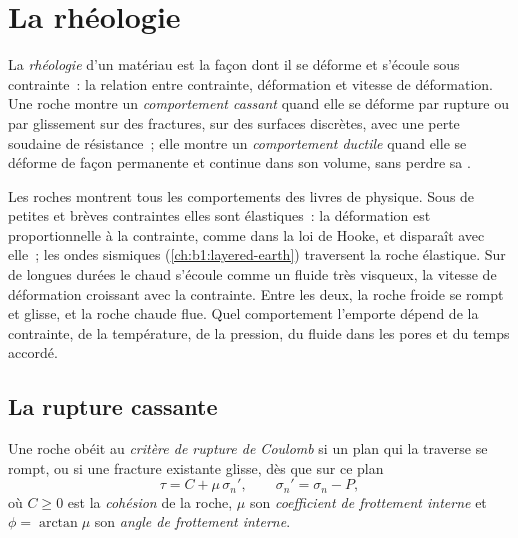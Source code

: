 \section{La rhéologie}\label{sec:b1:stress-strain-rheology:rheology}

\begin{definition}\label{def:b1:stress-strain-rheology:rheology}
La \emph{rhéologie} d'un matériau est la façon dont il se déforme et
s'écoule sous contrainte~: la relation entre contrainte, déformation et vitesse de
déformation. Une roche montre un \emph{comportement cassant} quand
elle se déforme par rupture ou par glissement sur des fractures, sur des surfaces discrètes, avec
une perte soudaine de résistance~; elle montre un \emph{comportement ductile} quand elle se déforme de façon permanente et continue dans son volume,
sans perdre sa .
\end{definition}

Les roches montrent tous les comportements des livres de physique. Sous de petites et brèves
contraintes elles sont élastiques~: la déformation est proportionnelle à la contrainte, comme dans
la loi de Hooke, et disparaît avec elle~; les ondes sismiques
(\cref{ch:b1:layered-earth}) traversent la roche élastique. Sur de longues durées le
 chaud s'écoule comme un fluide très visqueux, la vitesse de déformation croissant avec la
contrainte. Entre les deux, la roche froide se rompt et glisse, et la roche chaude flue. Quel
comportement l'emporte dépend de la contrainte, de la température, de la pression, du fluide
dans les pores et du temps accordé.

\subsection*{La rupture cassante}

\begin{definition}\label{def:b1:stress-strain-rheology:coulomb}
Une roche obéit au \emph{critère de rupture de Coulomb} si un plan qui la traverse se rompt, ou si une fracture existante glisse, dès
que sur ce plan
\[
  \tau = C + \mu\,\sigma_n' , \qquad \sigma_n' = \sigma_n - P ,
\]
où $C \ge 0$ est la \emph{cohésion} de la roche,
$\mu$ son \emph{coefficient de frottement interne} et $\phi = \arctan\mu$ son \emph{angle de
frottement interne}.
\end{definition}

